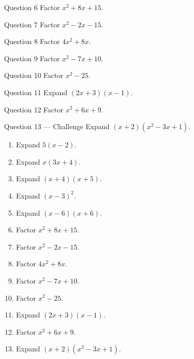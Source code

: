 \documentclass[11pt]{article}
\begin{document}
\begin{qbox}{Question 6}
Factor $x^2+8x+15$.\workspace{2.4cm}
\end{qbox}

\begin{qbox}{Question 7}
Factor $x^2-2x-15$.\workspace{2.4cm}
\end{qbox}

\begin{qbox}{Question 8}
Factor $4x^2+8x$.\workspace{2.4cm}
\end{qbox}

\begin{qbox}{Question 9}
Factor $x^2-7x+10$.\workspace{2.4cm}
\end{qbox}

\begin{qbox}{Question 10}
Factor $x^2-25$.\workspace{2.4cm}
\end{qbox}

\begin{qbox}{Question 11}
Expand $(2x+3)(x-1)$.\workspace{2.4cm}
\end{qbox}

\begin{qbox}{Question 12}
Factor $x^2+6x+9$.\workspace{2.4cm}
\end{qbox}

\begin{qbox}{Question 13 --- Challenge}
Expand $(x+2)(x^2-3x+1)$.\workspace{3cm}
\end{qbox}

\clearpage
{}

\begin{recapbox}
\begin{multicols}{2}
\small
\begin{enumerate}[leftmargin=*,itemsep=3pt]
  \item Expand $5(x-2)$.
  \item Expand $x(3x+4)$.
  \item Expand $(x+4)(x+5)$.
  \item Expand $(x-3)^2$.
  \item Expand $(x-6)(x+6)$.
  \item Factor $x^2+8x+15$.
  \item Factor $x^2-2x-15$.
  \item Factor $4x^2+8x$.
  \item Factor $x^2-7x+10$.
  \item Factor $x^2-25$.
  \item Expand $(2x+3)(x-1)$.
  \item Factor $x^2+6x+9$.
  \item Expand $(x+2)(x^2-3x+1)$.
\end{enumerate}
\end{multicols}
\end{recapbox}
\end{document}
